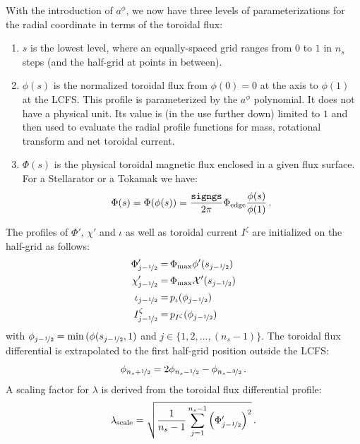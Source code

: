With the introduction of $a^\phi$, we now have three levels of parameterizations for the radial coordinate in terms of the toroidal flux:
\begin{enumerate}
  \item $s$ is the lowest level, where an equally-spaced grid ranges from $0$ to $1$ in $n_s$ steps (and the half-grid at points in between). \\
  \item $\phi(s)$ is the normalized toroidal flux from $\phi(0)=0$ at the axis to $\phi(1)$ at the LCFS.
        This profile is parameterized by the $a^\phi$ polynomial. It does not have a physical unit.
        Its value is (in the use further down) limited to $1$ and then
        used to evaluate the radial profile functions for mass, rotational transform and net toroidal current. \\
  \item $\Phi(s)$ is the physical toroidal magnetic flux enclosed in a given flux surface.
        For a Stellarator or a Tokamak we have:
        \begin{equation}
          \Phi(s) = \Phi(\phi(s)) = \frac{\texttt{signgs}}{2 \pi} \Phi_\mathrm{edge} \frac{\phi(s)}{\phi(1)} \, .
        \end{equation}
\end{enumerate}
The profiles of $\Phi'$, $\chi'$ and $\iota$ as well as toroidal current $I^\zeta$ are initialized on the half-grid as follows:
\begin{align}
  \Phi'_{j-\nicefrac{1}{2}} =&\, \Phi_\mathrm{max} \phi'(s_{j-\nicefrac{1}{2}}) \\
  \chi'_{j-\nicefrac{1}{2}} =&\, \Phi_\mathrm{max} \mathcal{X}'(s_{j-\nicefrac{1}{2}}) \\
  \iota_{j-\nicefrac{1}{2}} =&\, p_\iota    (\phi_{j-\nicefrac{1}{2}}) \\
I^\zeta_{j-\nicefrac{1}{2}} =&\, p_{I^\zeta}(\phi_{j-\nicefrac{1}{2}})
\end{align}
with $\phi_{j-\nicefrac{1}{2}} = \mathrm{min}\,(\phi(s_{j-\nicefrac{1}{2}}, 1)$ and $j \in \{ 1, 2, ..., (n_s-1) \}$.
The toroidal flux differential is extrapolated to the first half-grid position outside the LCFS:
\begin{equation}
  \phi_{n_s+\nicefrac{1}{2}} = 2 \phi_{n_s-\nicefrac{1}{2}} - \phi_{n_s-\nicefrac{3}{2}} \, .
\end{equation}
A scaling factor for $\lambda$ is derived from the toroidal flux differential profile:
\begin{equation}
  \lambda_\mathrm{scale} = \sqrt{\frac{1}{n_s-1} \sum\limits_{j=1}^{n_s-1} \left( \Phi'_{j-\nicefrac{1}{2}} \right)^2} \, . \label{eqn:lamscale}
\end{equation}
